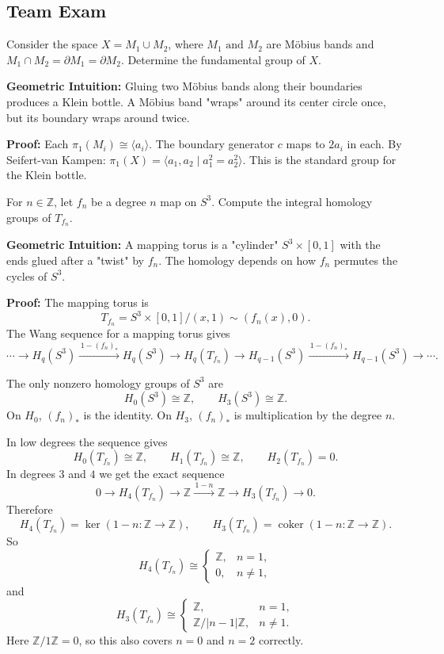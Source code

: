 \subsection{Team Exam}

\begin{exercise}
\label{geometry:2017:7}
Consider the space $X = M_{1} \cup M_{2}$, where $M_{1} \text{ and } M_{2}$ are Möbius bands and $M_{1} \cap M_{2} = \partial M_{1} = \partial M_{2}$. Determine the fundamental group of $X$.
\end{exercise}

\begin{solution}
\textbf{Geometric Intuition:} Gluing two Möbius bands along their boundaries produces a Klein bottle. A Möbius band "wraps" around its center circle once, but its boundary wraps around twice.

\textbf{Proof:} Each $\pi_1(M_i) \cong \langle a_i \rangle$. The boundary generator $c$ maps to $2 a_i$ in each.
By Seifert-van Kampen: $\pi_1(X) = \langle a_1, a_2 \mid a_1^2 = a_2^2 \rangle$. This is the standard group for the Klein bottle.
\end{solution}

\begin{exercise}
\label{geometry:2017:8}
For $n \in \mathbb{Z}$, let $f_{n}$ be a degree $n$ map on $S^{3}$. Compute the integral homology groups of $T_{f_{n}}$.
\end{exercise}

\begin{solution}
\textbf{Geometric Intuition:} A mapping torus is a "cylinder" $S^3 \times [0, 1]$ with the ends glued after a "twist" by $f_n$. The homology depends on how $f_n$ permutes the cycles of $S^3$.

\textbf{Proof:}
The mapping torus is
\[
T_{f_n}=S^3\times[0,1]/(x,1)\sim(f_n(x),0).
\]
The Wang sequence for a mapping torus gives
\[
\cdots\to H_q(S^3)
\xrightarrow{\,1-(f_n)_*\,}
H_q(S^3)
\to H_q(T_{f_n})
\to H_{q-1}(S^3)
\xrightarrow{\,1-(f_n)_*\,}
H_{q-1}(S^3)\to\cdots .
\]

The only nonzero homology groups of $S^3$ are
\[
H_0(S^3)\cong \mathbb{Z},\qquad H_3(S^3)\cong \mathbb{Z}.
\]
On $H_0$, $(f_n)_*$ is the identity. On $H_3$, $(f_n)_*$ is multiplication by the degree $n$.

In low degrees the sequence gives
\[
H_0(T_{f_n})\cong \mathbb{Z},\qquad
H_1(T_{f_n})\cong \mathbb{Z},\qquad
H_2(T_{f_n})=0.
\]
In degrees $3$ and $4$ we get the exact sequence
\[
0\to H_4(T_{f_n})
\to \mathbb{Z}
\xrightarrow{\,1-n\,}
\mathbb{Z}
\to H_3(T_{f_n})
\to 0.
\]
Therefore
\[
H_4(T_{f_n})=\ker(1-n:\mathbb{Z}\to\mathbb{Z}),
\qquad
H_3(T_{f_n})=\operatorname{coker}(1-n:\mathbb{Z}\to\mathbb{Z}).
\]
So
\[
H_4(T_{f_n})\cong
\begin{cases}
\mathbb{Z}, & n=1,\\
0, & n\neq 1,
\end{cases}
\]
and
\[
H_3(T_{f_n})\cong
\begin{cases}
\mathbb{Z}, & n=1,\\
\mathbb{Z}/|n-1|\mathbb{Z}, & n\neq 1.
\end{cases}
\]
Here $\mathbb{Z}/1\mathbb{Z}=0$, so this also covers $n=0$ and $n=2$ correctly.
\end{solution}

